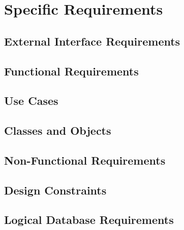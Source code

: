 
\section{Specific Requirements}

	\subsection{External Interface Requirements}
		

	\subsection{Functional Requirements}
		
		
		
		
		
		

	\subsection{Use Cases}
		
		
		
		
		
		

	\subsection{Classes and Objects}
		
		
		
		
				
		

	\subsection{Non-Functional Requirements}
		

	\subsection{Design Constraints}


	\subsection{Logical Database Requirements}
